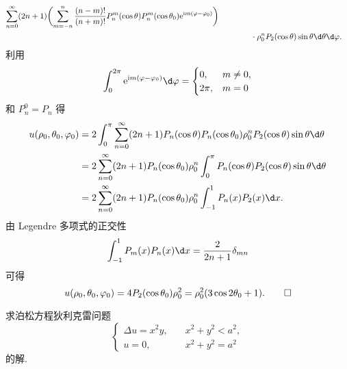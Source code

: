 \begin{solution}
\begin{equation}
\begin{aligned}
          \sum_{n=0}^\infty (2n+1) \biggl(\sum_{m=-n}^n \frac{(n-m)!}{(n+m)!} P_n^m(\cos\theta)
          P_n^m(\cos\theta_0) \e^{\upi m(\varphi-\varphi_0)}\biggr) \\
      & \qquad\qquad \cdot\rho_0^n P_2(\cos\theta) \sin\theta \d\theta\d\varphi.
    \end{aligned}
  \end{equation}
  利用
  \[ \int_0^{2\pi} \e^{\upi m(\varphi-\varphi_0)} \d\varphi
      = \begin{cases}
        0,    & m\neq 0, \\
        2\pi, & m=0
      \end{cases}\]
  和 $P_n^0=P_n$ 得
  \begin{equation}\label{eq:3.8}
  	\begin{aligned}
  		u(\rho_0,\theta_0,\varphi_0)
  		& = 2 \int_0^\pi \sum_{n=0}^\infty (2n+1) P_n(\cos\theta) P_n(\cos\theta_0)
  		\rho_0^n P_2(\cos\theta) \sin\theta \d\theta \\
  		& = 2 \sum_{n=0}^\infty (2n+1) P_n(\cos\theta_0) \rho_0^n
  		\int_0^\pi P_n(\cos\theta) P_2(\cos\theta) \sin\theta \d\theta \\
  		& = 2 \sum_{n=0}^\infty (2n+1) P_n(\cos\theta_0) \rho_0^n
  		\int_{-1}^1 P_n(x) P_2(x) \d x.
  		\end{aligned}
  \end{equation}
  由 Legendre 多项式的正交性
  \[ \int_{-1}^1 P_m(x)P_n(x) \d x = \frac{2}{2n+1}\delta_{mn}\]
  可得
  \[u(\rho_0,\theta_0,\varphi_0) = 4 P_2(\cos\theta_0) \rho_0^2 = \rho_0^2 (3\cos2\theta_0+1).\qedhere\]
\end{solution}


\begin{exercise}
	求泊松方程狄利克雷问题
	\[\begin{cases}
		\Delta u = x^2y, \quad &x^2 + y^2 < a^2, \\
		u=0, \quad &x^2 + y^2 = a^2
	\end{cases}\]
	的解.
\end{exercise}


